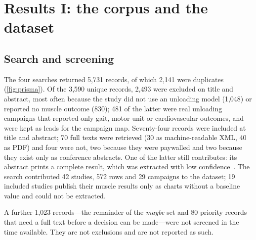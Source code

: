 \section{Results I: the corpus and the dataset}
\label{sec:results-data}

\subsection{Search and screening}

The four searches returned 5,731 records, of which 2,141 were duplicates (\cref{fig:prisma}). Of the 3,590 unique
records, 2,493 were excluded on title and abstract, most often because the study did not use an unloading model
(1,048) or reported no muscle outcome (830); 481 of the latter were real unloading campaigns that reported only gait,
motor-unit or cardiovascular outcomes, and were kept as leads for the campaign map. Seventy-four records were
included at title and abstract; 70 full texts were retrieved (30 as machine-readable XML, 40 as PDF) and four were
not, two because they were paywalled and two because they exist only as conference abstracts. One of the latter still
contributes: its abstract prints a complete result, which was extracted with low confidence~\citep{dirks2016}. The
search contributed 42 studies, 572 rows and 29 campaigns to the dataset; 19 included studies publish their muscle
results only as charts without a baseline value and could not be extracted.

A further 1,023 records---the remainder of the \emph{maybe} set and 80 priority records that need a full text
before a decision can be made---were not screened in the time available. They are not exclusions and are not
reported as such. 

